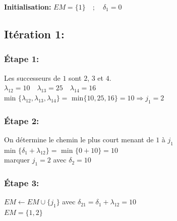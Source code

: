 \documentclass{article}
\begin{document}
\textbf{Initialisation:} \quad $EM=\{1\} \quad ; \quad  \delta_1=0$
\subsection*{Itération 1:}
\subsubsection*{Étape 1:}
Les successeurs de $1$ sont $2$, $3$ et $4$.\\
$\lambda_{12}=10 \quad \lambda_{13}=25 \quad \lambda_{14}=16$\\
min $\{\lambda_{12},\lambda_{13},\lambda_{14}\} = $ min$\{10,25,16\}=10 \Rightarrow j_1 =2 $\\
\subsubsection*{Étape 2:}
On détermine le chemin le plus court menant de $1$ à $j_1$\\
min $\{ \delta_1 + \lambda_{12}\} = $ min $\{0+10\}=10 $\\
marquer $j_1=2$ avec $\delta_2=10$\\ 
\subsubsection*{Étape 3:}
$EM \leftarrow EM \cup \{j_1\}$ \quad avec $ \delta_{21} = \delta_1 + \lambda_{12} = 10$ \\
$EM = \{1,2\}$\\
\end{document}
